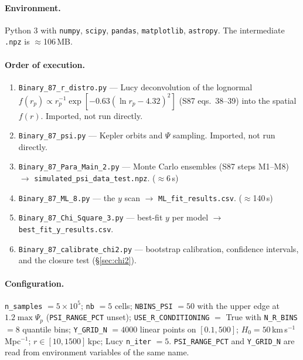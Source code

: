 \documentclass[11pt]{article}
\begin{document}
\paragraph{Environment.} Python 3 with \texttt{numpy}, \texttt{scipy},
\texttt{pandas}, \texttt{matplotlib}, \texttt{astropy}. The intermediate
\texttt{.npz} is $\approx$106\,MB.

\paragraph{Order of execution.}
\begin{enumerate}\itemsep2pt
  \item \texttt{Binary\_87\_r\_distro.py} --- Lucy deconvolution of the
        lognormal $f(r_p) \propto r_p^{-1}\exp[-0.63(\ln r_p - 4.32)^2]$
        (S87 eqs.~38--39) into the spatial $f(r)$. Imported, not run directly.
  \item \texttt{Binary\_87\_psi.py} --- Kepler orbits and $\Psi$ sampling.
        Imported, not run directly.
  \item \texttt{Binary\_87\_Para\_Main\_2.py} --- Monte Carlo ensembles
        (S87 steps M1--M8) $\rightarrow$
        \texttt{simulated\_psi\_data\_test.npz}. ($\approx$6\,s)
  \item \texttt{Binary\_87\_ML\_8.py} --- the $y$ scan $\rightarrow$
        \texttt{ML\_fit\_results.csv}. ($\approx$140\,s)
  \item \texttt{Binary\_87\_Chi\_Square\_3.py} --- best-fit $y$ per model
        $\rightarrow$ \texttt{best\_fit\_y\_results.csv}.
  \item \texttt{Binary\_87\_calibrate\_chi2.py} --- bootstrap calibration,
        confidence intervals, and the closure test (\S\ref{sec:chi2}).
\end{enumerate}

\paragraph{Configuration.} \texttt{n\_samples} $=5\times10^5$;
\texttt{nb} $=5$ cells; \texttt{NBINS\_PSI} $=50$ with the upper edge at
$1.2\max\Psi_p$ (\texttt{PSI\_RANGE\_PCT} unset); \texttt{USE\_R\_CONDITIONING}
$=$ True with \texttt{N\_R\_BINS} $=8$ quantile bins; \texttt{Y\_GRID\_N}
$=4000$ linear points on $[0.1,500]$; $H_0 =
50$\,km\,s$^{-1}$\,Mpc$^{-1}$; $r \in [10,1500]$\,kpc; Lucy \texttt{n\_iter}
$=5$. \texttt{PSI\_RANGE\_PCT} and \texttt{Y\_GRID\_N} are read from
environment variables of the same name.
\end{document}
